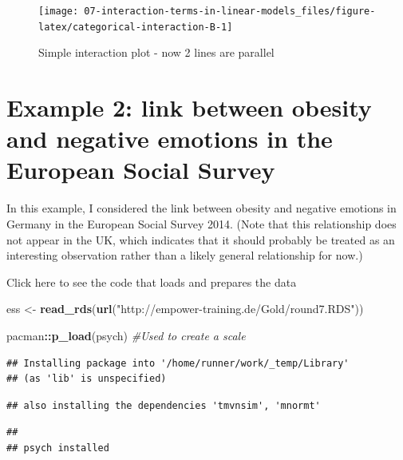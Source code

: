 \documentclass[
]{book}
\newenvironment{Shaded}{\begin{snugshade}}{\end{snugshade}}
\newcommand{\CommentTok}[1]{\textcolor[rgb]{0.56,0.35,0.01}{\textit{#1}}}
\newcommand{\KeywordTok}[1]{\textcolor[rgb]{0.13,0.29,0.53}{\textbf{#1}}}
\newcommand{\NormalTok}[1]{#1}
\newcommand{\OperatorTok}[1]{\textcolor[rgb]{0.81,0.36,0.00}{\textbf{#1}}}
\newcommand{\StringTok}[1]{\textcolor[rgb]{0.31,0.60,0.02}{#1}}
\begin{document}
\begin{figure}

{\centering \texttt{[image: 07-interaction-terms-in-linear-models\_files/figure-latex/categorical-interaction-B-1]} 

}

\caption{Simple interaction plot - now 2 lines are parallel}\label{fig:categorical-interaction-B}
\end{figure}

\hypertarget{example-2-link-between-obesity-and-negative-emotions-in-the-european-social-survey}{%
\section{Example 2: link between obesity and negative emotions in the European Social Survey}\label{example-2-link-between-obesity-and-negative-emotions-in-the-european-social-survey}}

In this example, I considered the link between obesity and negative emotions in Germany in the European Social Survey 2014. (Note that this relationship does not appear in the UK, which indicates that it should probably be treated as an interesting observation rather than a likely general relationship for now.)

Click here to see the code that loads and prepares the data

\begin{Shaded}
\begin{Highlighting}[]
\NormalTok{ess <-}\StringTok{ }\KeywordTok{read_rds}\NormalTok{(}\KeywordTok{url}\NormalTok{(}\StringTok{"http://empower-training.de/Gold/round7.RDS"}\NormalTok{))}

\NormalTok{pacman}\OperatorTok{::}\KeywordTok{p_load}\NormalTok{(psych) }\CommentTok{#Used to create a scale}
\end{Highlighting}
\end{Shaded}

\begin{verbatim}
## Installing package into '/home/runner/work/_temp/Library'
## (as 'lib' is unspecified)
\end{verbatim}

\begin{verbatim}
## also installing the dependencies 'tmvnsim', 'mnormt'
\end{verbatim}

\begin{verbatim}
## 
## psych installed
\end{verbatim}
\end{document}
